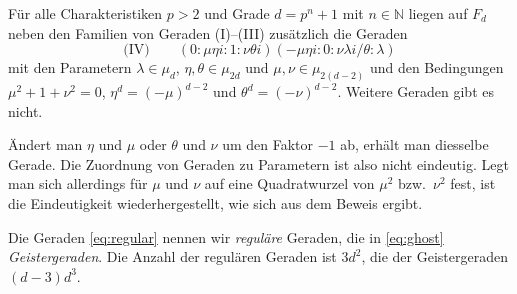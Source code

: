 \begin{theorem}[Geistergeraden]
Für alle Charakteristiken $p > 2$ und Grade $d = p^n + 1$ mit $n \in \mathbb N$ liegen auf $F_d$ neben den Familien von Geraden (I)--(III) zusätzlich die Geraden
\begin{equation} \label{eq:ghost}
\text{(IV)}\qquad (0:\mu\eta i:1:\nu\theta i)(-\mu\eta i:0:\nu\lambda i/\theta:\lambda)
\end{equation}
mit den Parametern $\lambda \in \mu_d$, $\eta, \theta \in \mu_{2d}$ und $\mu, \nu \in \mu_{2(d-2)}$ und den Bedingungen $\mu^2 + 1 + \nu^2 = 0$, $\eta^d = (-\mu)^{d-2}$ und $\theta^d = (-\nu)^{d-2}$. Weitere Geraden gibt es nicht.
\end{theorem}
\begin{remarks}
Ändert man $\eta$ und $\mu$ oder $\theta$ und $\nu$ um den Faktor $-1$ ab, erhält man diesselbe Gerade. Die Zuordnung von Geraden zu Parametern ist also nicht eindeutig. Legt man sich allerdings für $\mu$ und $\nu$ auf eine Quadratwurzel von $\mu^2$ bzw.~$\nu^2$ fest, ist die Eindeutigkeit wiederhergestellt, wie sich aus dem Beweis ergibt.
\end{remarks}
Die Geraden \eqref{eq:regular} nennen wir \emph{reguläre} Geraden, die in \eqref{eq:ghost} \emph{Geistergeraden}. Die Anzahl der regulären Geraden ist $3d^2$, die der Geistergeraden $(d-3)d^3$.
